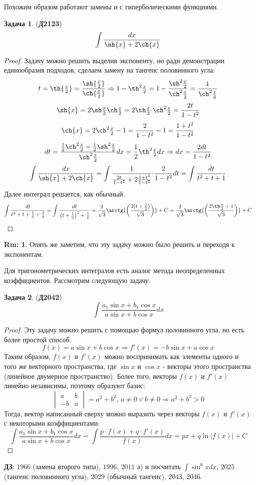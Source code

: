 \documentclass[12pt]{article}
\theoremstyle{definition}
\newtheorem{rem}{Rm:}
\newtheorem{problem}{Задача}
\DeclareMathOperator{\dint}{\displaystyle\int}
\begin{document}
Похожим образом работают замены и с гиперболическими функциями.
\begin{problem}(\textbf{Д2123})
	$$
		\dint\dfrac{dx}{\sh{x}  + 2\ch{x}}
	$$
\end{problem}
\begin{proof}
	Задачу можно решить выделив экспоненту, но ради демонстрации единообразия подходов, сделаем замену на тангенс половинного угла:
	$$
		t = \th{\tfrac{x}{2}} = \dfrac{\sh{\tfrac{x}{2}}}{\ch{\tfrac{x}{2}}} \Rightarrow 
		1 - \th^2{ \tfrac{x}{2}} = 1 - \dfrac{\sh^2 \tfrac{x}{2}}{ \ch^2 \tfrac{x}{2}} = \dfrac{1}{\ch^2 \tfrac{x}{2}}
	$$
	$$
		\sh{x} = 2\sh \tfrac{x}{2} \ch \tfrac{x}{2} = 2 \th \tfrac{x}{2} {\cdot} \ch^2 \tfrac{x}{2} = \dfrac{2t}{1 - t^2}
	$$
	$$
		\ch{x} = 2\ch^2 \tfrac{x}{2} - 1 = \dfrac{2}{1 - t^2} - 1 = \dfrac{1 + t^2}{1 - t^2}
	$$
	$$
		dt = \dfrac{\tfrac{1}{2}\ch^2 \tfrac{x}{2} - \tfrac{1}{2}\sh^2 \tfrac{x}{2} }{\ch^2 \tfrac{x}{2}} dx =  \dfrac{1}{2}\th^2 \tfrac{x}{2} dx \Rightarrow dx = \dfrac{2dt}{1 - t^2 }
	$$
	$$
		\dint\dfrac{dx}{\sh{x}  + 2\ch{x}} = \dint\dfrac{1}{\tfrac{2t}{1 - t^2} + 2\tfrac{1 + t^2}{1-t^2}}{\cdot}\dfrac{2}{1 -t^2}dt = \dint\dfrac{dt}{t^2 + t + 1}
	$$
	Далее интеграл решается, как обычный.
	$$
		\dint \dfrac{dt}{t^2 + t + \tfrac{1}{4} + \tfrac{3}{4}} = \dint \dfrac{dt}{\left(t + \tfrac{1}{2}\right)^2 + \tfrac{3}{4}} = \dfrac{2}{\sqrt{3}}\arctg{\left(\dfrac{2(t + \tfrac{1}{2})}{\sqrt{3}}\right)} + C = \dfrac{2}{\sqrt{3}}\arctg{\left(\dfrac{2 \th \tfrac{x}{2} + 1}{\sqrt{3}}\right)} + C
	$$
\end{proof}
\begin{rem}
	Опять же заметим, что эту задачу можно было решить и переходя к экспонентам.
\end{rem}

Для тригонометрических интегралов есть аналог метода неопределенных коэффициентов. Рассмотрим следующую задачу.

\begin{problem}(\textbf{Д2042})
	$$
		\dint\dfrac{a_1 \sin{x} + b_1 \cos{x}}{a \sin{x} + b\cos{x}}dx
	$$
\end{problem}
\begin{proof}
	Эту задачу можно решить с помощью формул половинного угла, но есть более простой способ.
	$$
		f(x) = a \sin{x} + b\cos{x} \Rightarrow f'(x) = -b \sin{x} + a\cos{x}
	$$
	Таким образом, $f(x)$ и $f'(x)$ можно воспринимать как элементы одного и того же векторного пространства, где $\sin{x}$ и $\cos{x}$ - векторы этого пространства (линейное двумерное пространство). Более того, векторы $f(x)$ и $f'(x)$ линейно независимы, поэтому образуют базис:
	$$
		\begin{vmatrix}
			a & b \\
			-b& a
		\end{vmatrix} = a^2 + b^2, \, a \neq 0 \vee b \neq 0 \Rightarrow a^2 + b^2 > 0
	$$
	Тогда, вектор написанный сверху можно выразить через векторы $f(x)$ и $f'(x)$ с некоторыми коэффициентами:
	$$
		\dint\dfrac{a_1 \sin{x} + b_1 \cos{x}}{a \sin{x} + b\cos{x}}dx =  \dint \dfrac{p{\cdot}f(x) + q{\cdot}f'(x)}{f(x)}dx = px + q\ln{|f(x)|} + C
	$$
\end{proof}

\textbf{ДЗ}: $1966$ (замена второго типа), $1996$, $2011$ а) и посчитать $\dint \sin^6{x}dx$, $2025$ (тангенс половинного угла), $2029$ (обычный тангенс), $2043$, $2046$.
\end{document}
